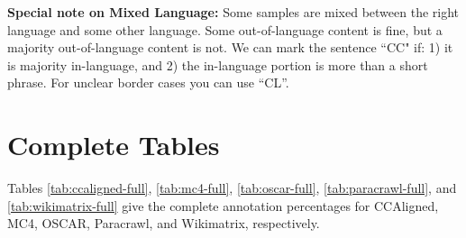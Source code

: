 \textbf{Special note on Mixed Language:} Some samples are mixed between the right language and some other language. Some out-of-language content is fine, but a majority out-of-language content is not. We can mark the sentence ``CC" if: 1) it is majority in-language, and 2) the in-language portion is more than a short phrase. For unclear border cases you can use “CL”.


\section{Complete Tables}\label{app:stats}
Tables \ref{tab:ccaligned-full}, \ref{tab:mc4-full}, \ref{tab:oscar-full}, \ref{tab:paracrawl-full}, and \ref{tab:wikimatrix-full} give the complete annotation percentages for CCAligned, MC4, OSCAR, Paracrawl, and Wikimatrix, respectively.
